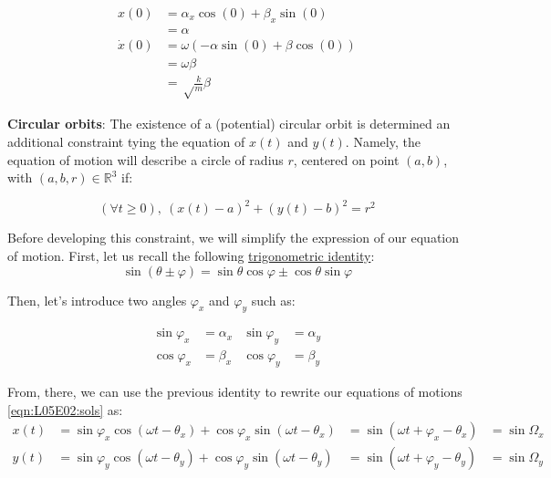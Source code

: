 \documentclass[solutions.tex]{subfiles}
\begin{document}
\begin{equation}
	\begin{aligned}
		x(0) &= \alpha_x\cos(0)+\beta_x\sin(0) \\
		~ &= \alpha \\
		\dot{x}(0) &= \omega(-\alpha\sin(0)+\beta\cos(0)) \\
		~ &= \omega\beta \\
		~ &= \sqrt\frac{k}{m}\beta
	\end{aligned}
\end{equation}

\hfill \break

\textbf{Circular orbits}: The existence of a (potential) circular orbit
is determined an additional constraint tying the equation of $x(t)$ and
$y(t)$. Namely, the equation of motion will describe a circle of radius
$r$, centered on point $(a, b)$, with $(a, b, r)\in\mathbb{R}^3$ if:

\begin{equation}
	\label{eqn:L05E02:circle-constraint}
	(\forall t \geq 0),\ (x(t)-a)^2+(y(t)-b)^2 = r^2
\end{equation}

Before developing this constraint, we will simplify
the expression of our equation of motion. First, let us recall
the following
\href{https://en.wikipedia.org/wiki/List\_of\_trigonometric\_identities\#Angle\_sum\_and\_difference\_identities}
{trigonometric identity}:
\[
	\sin(\theta \pm \varphi) = \sin\theta\cos\varphi \pm \cos\theta\sin\varphi
\]

Then, let's introduce two angles $\varphi_x$ and $\varphi_y$ such as:

\begin{equation*} \begin{aligned}
	\sin\varphi_x &= \alpha_x & \sin\varphi_y &= \alpha_y \\
	\cos\varphi_x &= \beta_x  & \cos\varphi_y &= \beta_y
\end{aligned} \end{equation*}

From, there, we can use the previous identity to rewrite our equations of
motions \eqref{eqn:L05E02:sols} as:
\begin{equation} \label{eqn:L0502:sols-simpl} \begin{aligned}
	x(t) &= \sin\varphi_x\cos(\omega t-\theta_x)+\cos\varphi_x\sin(\omega t-\theta_x)
	&= \sin(\omega t + \varphi_x - \theta_x) &= \sin\Omega_x \\
	y(t) &= \sin\varphi_y\cos(\omega t-\theta_y)+\cos\varphi_y\sin(\omega t-\theta_y)
	&= \sin(\omega t + \varphi_y -\theta_y) &= \sin\Omega_y
\end{aligned} \end{equation}
\end{document}
